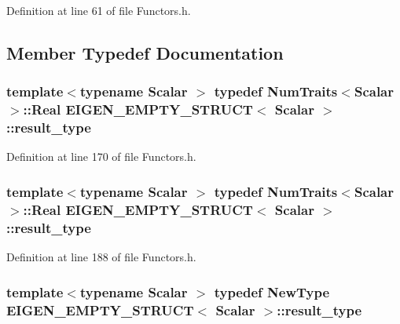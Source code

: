 Definition at line 61 of file Functors.\-h.



\subsection{Member Typedef Documentation}
\hypertarget{struct_e_i_g_e_n___e_m_p_t_y___s_t_r_u_c_t_a99f2ce1c1dfd4e7ff53eadc336c7816e}{
\subsubsection[{result\-\_\-type}]{\setlength{\rightskip}{0pt plus 5cm}template$<$typename Scalar $>$ typedef {\bf Num\-Traits}$<$Scalar$>$\-::Real {\bf E\-I\-G\-E\-N\-\_\-\-E\-M\-P\-T\-Y\-\_\-\-S\-T\-R\-U\-C\-T}$<$ Scalar $>$\-::{\bf result\-\_\-type}}}\label{struct_e_i_g_e_n___e_m_p_t_y___s_t_r_u_c_t_a99f2ce1c1dfd4e7ff53eadc336c7816e}


Definition at line 170 of file Functors.\-h.

\hypertarget{struct_e_i_g_e_n___e_m_p_t_y___s_t_r_u_c_t_a99f2ce1c1dfd4e7ff53eadc336c7816e}{
\subsubsection[{result\-\_\-type}]{\setlength{\rightskip}{0pt plus 5cm}template$<$typename Scalar $>$ typedef {\bf Num\-Traits}$<$Scalar$>$\-::Real {\bf E\-I\-G\-E\-N\-\_\-\-E\-M\-P\-T\-Y\-\_\-\-S\-T\-R\-U\-C\-T}$<$ Scalar $>$\-::{\bf result\-\_\-type}}}\label{struct_e_i_g_e_n___e_m_p_t_y___s_t_r_u_c_t_a99f2ce1c1dfd4e7ff53eadc336c7816e}


Definition at line 188 of file Functors.\-h.

\hypertarget{struct_e_i_g_e_n___e_m_p_t_y___s_t_r_u_c_t_a3373b29b073fe71df1840caf9cb13b2d}{
\subsubsection[{result\-\_\-type}]{\setlength{\rightskip}{0pt plus 5cm}template$<$typename Scalar $>$ typedef New\-Type {\bf E\-I\-G\-E\-N\-\_\-\-E\-M\-P\-T\-Y\-\_\-\-S\-T\-R\-U\-C\-T}$<$ Scalar $>$\-::{\bf result\-\_\-type}}}\label{struct_e_i_g_e_n___e_m_p_t_y___s_t_r_u_c_t_a3373b29b073fe71df1840caf9cb13b2d}


